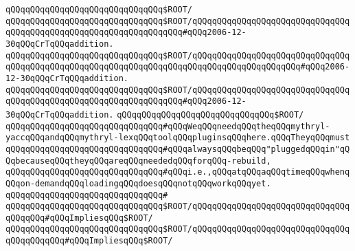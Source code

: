 \verb|qQQqqQQqqQQqqQQqqQQqqQQqqQQqqQQq$ROOT/|\newline
\verb|qQQqqQQqqQQqqQQqqQQqqQQqqQQqqQQq$ROOT/|\verb|qQQqqQQqqQQqqQQqqQQqqQQqqQQqqQQqqQQqqQQqqQQqqQQqqQQqqQQqqQQqqQQqqQQq#qQQq2006-12-30qQQqCrTqQQqaddition.|\newline
\verb|qQQqqQQqqQQqqQQqqQQqqQQqqQQqqQQq$ROOT/|\verb|qQQqqQQqqQQqqQQqqQQqqQQqqQQqqQQqqQQqqQQqqQQqqQQqqQQqqQQqqQQqqQQqqQQqqQQqqQQqqQQqqQQqqQQqqQQq#qQQq2006-12-30qQQqCrTqQQqaddition.|\newline
\verb|qQQqqQQqqQQqqQQqqQQqqQQqqQQqqQQq$ROOT/|\verb|qQQqqQQqqQQqqQQqqQQqqQQqqQQqqQQqqQQqqQQqqQQqqQQqqQQqqQQqqQQqqQQqqQQq#qQQq2006-12-30qQQqCrTqQQqaddition.|\newline
\newline
\newline
\verb|qQQqqQQqqQQqqQQqqQQqqQQqqQQqqQQq$ROOT/|\newline
\newline
\newline
\verb|qQQqqQQqqQQqqQQqqQQqqQQqqQQqqQQq#qQQqWeqQQqneedqQQqtheqQQqmythryl-yaccqQQqandqQQqmythryl-lexqQQqtoolqQQqpluginsqQQqhere.qQQqTheyqQQqmust|\newline
\verb|qQQqqQQqqQQqqQQqqQQqqQQqqQQqqQQq#qQQqalwaysqQQqbeqQQq"pluggedqQQqin"qQQqbecauseqQQqtheyqQQqareqQQqneededqQQqforqQQq-rebuild,|\newline
\verb|qQQqqQQqqQQqqQQqqQQqqQQqqQQqqQQq#qQQqi.e.,qQQqatqQQqaqQQqtimeqQQqwhenqQQqon-demandqQQqloadingqQQqdoesqQQqnotqQQqworkqQQqyet.|\newline
\verb|qQQqqQQqqQQqqQQqqQQqqQQqqQQqqQQq#|\newline
\verb|qQQqqQQqqQQqqQQqqQQqqQQqqQQqqQQq$ROOT/|\verb|qQQqqQQqqQQqqQQqqQQqqQQqqQQqqQQqqQQqqQQq#qQQqImpliesqQQq$ROOT/|\newline
\verb|qQQqqQQqqQQqqQQqqQQqqQQqqQQqqQQq$ROOT/|\verb|qQQqqQQqqQQqqQQqqQQqqQQqqQQqqQQqqQQqqQQqqQQq#qQQqImpliesqQQq$ROOT/|\newline
